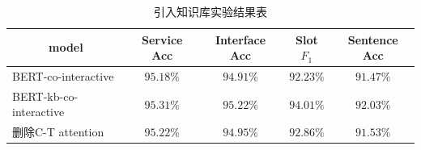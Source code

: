   \begin{table}[htb]
    \centering
    \caption{引入知识库实验结果表}
    \label{tab:kbjieguo}
\begin{tabular}{l|cccc}
  \toprule
  \multicolumn{1}{c|}{\centering model}&Service Acc&Interface Acc&Slot $F_1$&Sentence Acc\\
   \hline
   BERT-co-interactive&$95.18\%$&$94.91\%$&$92.23\%$&$91.47\%$\\
   BERT-kb-co-interactive&$\mathbf{95.31\%}$&$\mathbf{95.22}\%$&$\mathbf{94.01}\%$&$\mathbf{92.03}\%$\\
   删除C-T attention&$95.22\%$&$94.95\%$&$92.86\%$&$91.53\%$\\
  \bottomrule
  \end{tabular}
\end{table}

